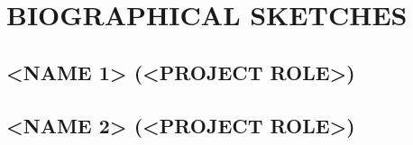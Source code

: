 \section{BIOGRAPHICAL SKETCHES}

\subsection{<NAME 1> (<PROJECT ROLE>)}

\newpage

\subsection{<NAME 2> (<PROJECT ROLE>)}

\newpage